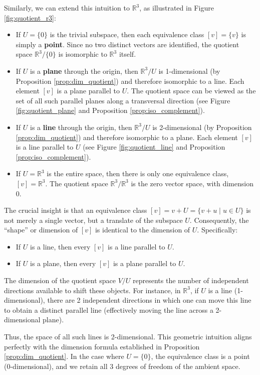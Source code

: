 Similarly, we can extend this intuition to $\mathbb{R}^3$, as illustrated in Figure \cref{fig:quotient_r3}:
\begin{itemize}
  \item If $U = \{0\}$ is the trivial subspace, then each equivalence class $[v] = \{v\}$ is simply a \textbf{point}. Since no two distinct vectors are identified, the quotient space $\mathbb{R}^3/\{0\}$ is isomorphic to $\mathbb{R}^3$ itself.
  \item If $U$ is a \textbf{plane} through the origin, then $\mathbb{R}^3/U$ is 1-dimensional (by Proposition \cref{prop:dim_quotient}) and therefore isomorphic to a line. Each element $[v]$ is a plane parallel to $U$. The quotient space can be viewed as the set of all such parallel planes  along a transversal direction (see Figure \cref{fig:quotient_plane} and Proposition \cref{prop:iso_complement}).
  \item If $U$ is a \textbf{line} through the origin, then $\mathbb{R}^3/U$ is 2-dimensional (by Proposition \cref{prop:dim_quotient}) and therefore isomorphic to a plane. Each element $[v]$ is a line parallel to $U$ (see Figure \cref{fig:quotient_line} and Proposition \cref{prop:iso_complement}).
  \item If $U = \mathbb{R}^3$ is the entire space, then there is only one equivalence class, $[v] = \mathbb{R}^3$. The quotient space $\mathbb{R}^3/\mathbb{R}^3$ is the zero vector space, with dimension $0$.
\end{itemize}

\begin{remark}
  The crucial insight is that an equivalence class $[v] = v + U = \{v + u \mid u \in U\}$ is not merely a single vector, but a translate of the subspace $U$. Consequently, the ``shape'' or dimension of $[v]$ is identical to the dimension of $U$. Specifically:
  \begin{itemize}
    \item If $U$ is a line, then every $[v]$ is a line parallel to $U$.
    \item If $U$ is a plane, then every $[v]$ is a plane parallel to $U$.
  \end{itemize}
  The dimension of the quotient space $V/U$ represents the number of independent directions available to shift these objects. For instance, in $\mathbb{R}^3$, if $U$ is a line (1-dimensional), there are 2 independent directions in which one can move this line to obtain a distinct parallel line (effectively moving the line across a 2-dimensional plane). 
  
  Thus, the space of all such lines is 2-dimensional. This geometric intuition aligns perfectly with the dimension formula established in Proposition \cref{prop:dim_quotient}. In the case where $U = \{0\}$, the equivalence class is a point (0-dimensional), and we retain all 3 degrees of freedom of the ambient space.
\end{remark}

